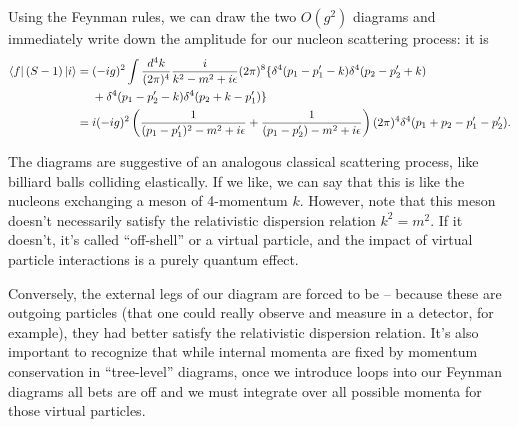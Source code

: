 Using the Feynman rules, we can draw the two $O(g^2)$ diagrams and immediately write down the amplitude for our nucleon scattering process: it is
\begin{align*}
\left< f \right|(S-1)\left| i \right>={}&(-ig)^2\int \frac{d^4k}{(2\pi)^4} \frac{i}{k^2-m^2+i\epsilon} (2\pi)^8 \{\delta^4(p_1-p_1' -k)\delta^4(p_2-p_2' +k)\\
&+\delta^4(p_1-p_2'-k)\delta^4(p_2+k-p_1')\}\\
={}& i(-ig)^2 \left(\frac{1}{(p_1-p_1')^2-m^2+i\epsilon}+\frac{1}{(p_1-p_2')-m^2+i\epsilon}\right) (2\pi)^4 \delta^4(p_1+p_2-p_1' -p_2').
\end{align*}

The diagrams are suggestive of an analogous classical scattering process, like billiard balls colliding elastically. If we like, we can say that this is like the nucleons exchanging a meson of 4-momentum $k$. However, note that this meson doesn't necessarily satisfy the relativistic dispersion relation $k^2=m^2$. If it doesn't, it's called ``off-shell'' or a virtual particle, and the impact of virtual particle interactions is a purely quantum effect. 

Conversely, the external legs of our diagram are forced to be -- because these are outgoing particles (that one could really observe and measure in a detector, for example), they had better satisfy the relativistic dispersion relation. It's also important to recognize that while internal momenta are fixed by momentum conservation in ``tree-level'' diagrams, once we introduce loops into our Feynman diagrams all bets are off and we must integrate over all possible momenta for those virtual particles.